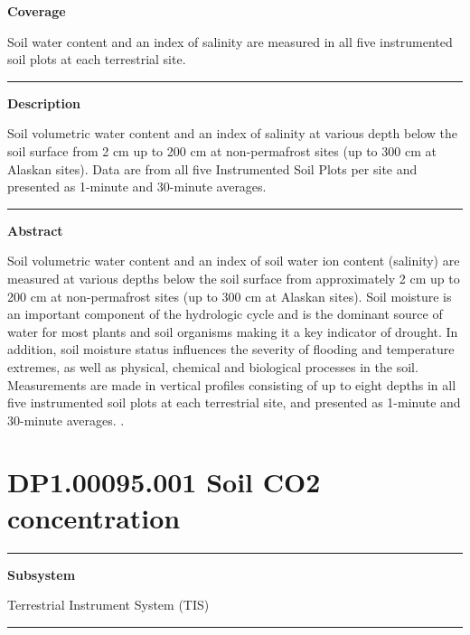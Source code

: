 \documentclass[]{article}
\begin{document}
\textbf{Coverage}

Soil water content and an index of salinity are measured in all five
instrumented soil plots at each terrestrial site.

\begin{center}\rule{0.5\linewidth}{\linethickness}\end{center}

\textbf{Description}

Soil volumetric water content and an index of salinity at various depth
below the soil surface from 2 cm up to 200 cm at non-permafrost sites
(up to 300 cm at Alaskan sites). Data are from all five Instrumented
Soil Plots per site and presented as 1-minute and 30-minute averages.

\begin{center}\rule{0.5\linewidth}{\linethickness}\end{center}

\textbf{Abstract}

Soil volumetric water content and an index of soil water ion content
(salinity) are measured at various depths below the soil surface from
approximately 2 cm up to 200 cm at non-permafrost sites (up to 300 cm at
Alaskan sites). Soil moisture is an important component of the
hydrologic cycle and is the dominant source of water for most plants and
soil organisms making it a key indicator of drought. In addition, soil
moisture status influences the severity of flooding and temperature
extremes, as well as physical, chemical and biological processes in the
soil. Measurements are made in vertical profiles consisting of up to
eight depths in all five instrumented soil plots at each terrestrial
site, and presented as 1-minute and 30-minute averages. \newpage
.

\section{DP1.00095.001 Soil CO2
concentration}\label{dp1.00095.001-soil-co2-concentration}

\begin{center}\rule{0.5\linewidth}{\linethickness}\end{center}

\textbf{Subsystem}

Terrestrial Instrument System (TIS)

\begin{center}\rule{0.5\linewidth}{\linethickness}\end{center}
\end{document}
